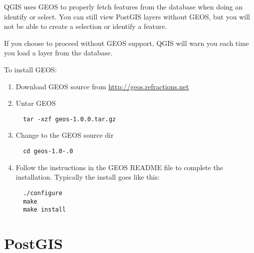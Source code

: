   QGIS uses GEOS to properly fetch features from the database when doing an
  identify or select. You can still view PostGIS layers without GEOS, but you
  will not be able to create a selection or identify a feature.

  If you choose to proceed without GEOS support, QGIS will warn you each time you load a layer from the database.

  To install GEOS:
  \begin{enumerate}
  \item Download GEOS source from \url{http://geos.refractions.net}
  \item Untar GEOS
  \begin{verbatim}
  tar -xzf geos-1.0.0.tar.gz
  \end{verbatim}
  \item Change to the GEOS source dir
  \begin{verbatim}
  cd geos-1.0-.0
  \end{verbatim}
  \item Follow the instructions in the GEOS README file to complete the installation. Typically the install goes like this:
  \begin{verbatim}
  ./configure
  make
  make install
  \end{verbatim}

  \end{enumerate}

  \section{PostGIS}

